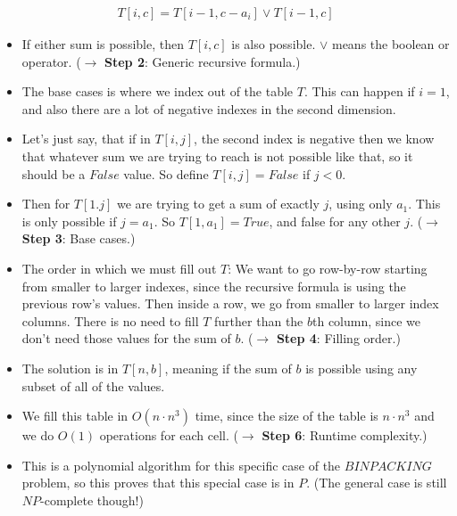 \begin{align*}
    T[i,c] = T[i-1, c-a_i] \lor{} T[i-1, c]
\end{align*}

\begin{itemize}
\item If either sum is possible, then $T[i,c]$ is also possible. $\lor{}$ means the boolean or operator.  ($\rightarrow$ \textbf{Step 2}: Generic recursive formula.)
\item The base cases is where we index out of the table $T$. This can happen if $i=1$, and also there are a lot of negative indexes in the second dimension.
\item Let's just say, that if in $T[i,j]$, the second index is negative then we know that whatever sum we are trying to reach is not possible like that, so it should be a $False$ value. So define $T[i,j] = False$ if $j<0$.
\item Then for $T[1.j]$ we are trying to get a sum of exactly $j$, using only $a_1$. This is only possible if $j=a_1$. So $T[1,a_1] = True$, and false for any other $j$. ($\rightarrow$ \textbf{Step 3}: Base cases.)
\item The order in which we must fill out $T$: We want to go row-by-row starting from smaller to larger indexes, since the recursive formula is using the previous row's values. Then inside a row, we go from smaller to larger index columns. There is no need to fill $T$ further than the $b$th column, since we don't need those values for the sum of $b$. ($\rightarrow$ \textbf{Step 4}: Filling order.)
\item The solution is in $T[n,b]$, meaning if the sum of $b$ is possible using any subset of all of the values.
\item We fill this table in $O(n\cdot{}n^3)$ time, since the size of the table is $n\cdot{}n^3$ and we do $O(1)$ operations for each cell. ($\rightarrow$ \textbf{Step 6}: Runtime complexity.)
\item This is a polynomial algorithm for this specific case of the $BINPACKING$ problem, so this proves that this special case is in $P$. (The general case is still $NP$-complete though!)
\end{itemize}